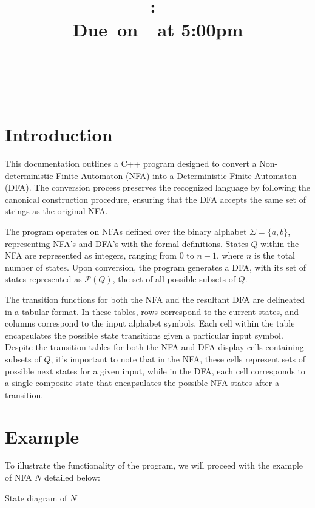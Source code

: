 \documentclass{article}
\title{
    \vspace{2in}
    \textmd{\textbf{\hmwkClass:\ \hmwkTitle}}\\
    \normalsize\vspace{0.1in}\small{Due\ on\ \hmwkDueDate\ at 5:00pm}\\
    \vspace{0.1in}\large{\textit{\hmwkClassInstructor}} \\
    \vspace{3in}
}
\author{
  \hmwkAuthorName \\
  \vspace{0.1in}\small\hmwkPID
}
\date{}
\begin{document}
\maketitle

\pagebreak

\section*{Introduction}

This documentation outlines a C++ program designed to convert a Non-deterministic Finite Automaton (NFA) into a Deterministic Finite Automaton (DFA). The conversion process preserves the recognized language by following the canonical construction procedure, ensuring that the DFA accepts the same set of strings as the original NFA.

The program operates on NFAs defined over the binary alphabet $\Sigma = \{a, b\}$, representing NFA's and DFA's with the formal definitions. States $Q$ within the NFA are represented as integers, ranging from 0 to $n - 1$, where $n$ is the total number of states. Upon conversion, the program generates a DFA, with its set of states represented as $\mathcal{P}(Q)$, the set of all possible subsets of $Q$.

The transition functions for both the NFA and the resultant DFA are delineated in a tabular format. In these tables, rows correspond to the current states, and columns correspond to the input alphabet symbols. Each cell within the table encapsulates the possible state transitions given a particular input symbol. Despite the transition tables for both the NFA and DFA display cells containing subsets of $Q$, it's important to note that in the NFA, these cells represent sets of possible next states for a given input, while in the DFA, each cell corresponds to a single composite state that encapsulates the possible NFA states after a transition.

\section*{Example}

To illustrate the functionality of the program, we will proceed with the example of NFA $N$ detailed below:

\begin{center}
  State diagram of $N$

\end{center}
\end{document}
